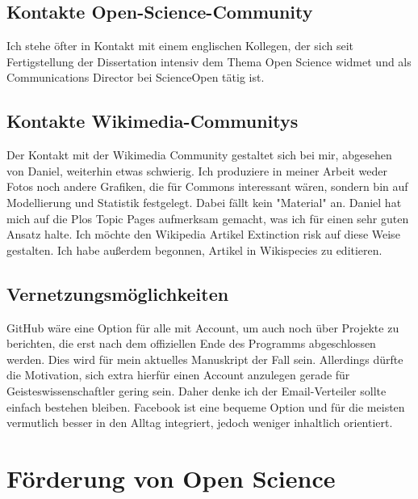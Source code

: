 \documentclass[11pt,a4paper]{article}
\begin{document}
\subsection{Kontakte Open-Science-Community}%
Ich stehe öfter in Kontakt mit einem englischen Kollegen, der sich seit Fertigstellung der Dissertation intensiv dem Thema Open Science widmet und als Communications Director bei ScienceOpen tätig ist.


\subsection{Kontakte Wikimedia-Communitys}%
Der Kontakt mit der Wikimedia Community gestaltet sich bei mir, abgesehen von Daniel, weiterhin etwas schwierig. Ich produziere in meiner Arbeit weder Fotos noch andere Grafiken, die für Commons interessant wären, sondern bin auf Modellierung und Statistik festgelegt. Dabei fällt kein "Material" an. Daniel hat mich auf die Plos Topic Pages aufmerksam gemacht, was ich für einen sehr guten Ansatz halte. Ich möchte den Wikipedia Artikel Extinction risk auf diese Weise gestalten. Ich habe außerdem begonnen, Artikel in Wikispecies zu editieren.

\subsection{Vernetzungsmöglichkeiten} %
GitHub wäre eine Option für alle mit Account, um auch noch über Projekte zu berichten, die erst nach dem offiziellen Ende des Programms abgeschlossen werden. Dies wird für mein aktuelles Manuskript der Fall sein. Allerdings dürfte die Motivation, sich extra hierfür einen Account anzulegen gerade für Geisteswissenschaftler gering sein. Daher denke ich der Email-Verteiler sollte einfach bestehen bleiben. Facebook ist eine bequeme Option und für die meisten vermutlich besser in den Alltag integriert, jedoch weniger inhaltlich orientiert. 





\section{Förderung von Open Science} %
\end{document}
